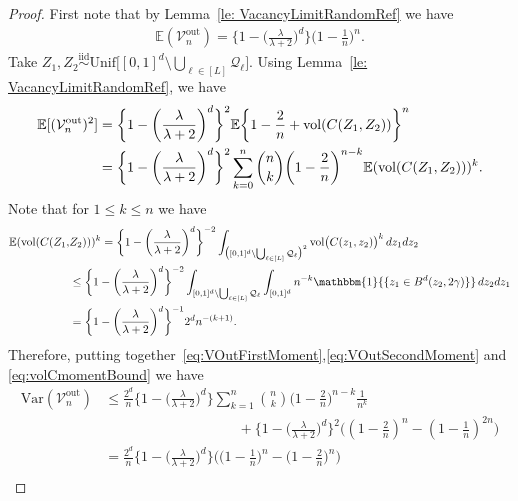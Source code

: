 \documentclass[11pt]{article}
\newcommand{\E}{\mathbb{E}}
\newcommand{\mQ}{\mathcal{Q}}
\newcommand{\vol}{\mathrm{vol}}
\newcommand{\var}{\mathrm{Var}}
\newcommand{\iid}{\stackrel{\mathrm{iid}}\sim}
\begin{document}
\begin{proof}
    First note that by Lemma~\ref{le: VacancyLimitRandomRef} we have
    \begin{align}\label{eq:VOutFirstMoment}
        \E(\mathcal{V}_n^{\mathrm{out}}) = \biggl\{1 - \biggl(\frac{\lambda}{\lambda +2 }\biggr)^d\biggr\}\biggl(1 - \frac{1}{n}\biggr)^n.
    \end{align}
    Take $Z_1, Z_2\iid\mathrm{Unif}\big[[0, 1]^d\setminus\bigcup_{\ell\in[L]}\mQ_\ell\big]$. Using Lemma~\ref{le: VacancyLimitRandomRef}, we have
    \begin{align}
        \E[(\mathcal{V}_n^{\mathrm{out}})^2] &=  \biggl\{ 1 - \biggl(\frac{\lambda}{\lambda +2 }\biggr)^d\biggr\}^2 \E\biggl\{1 - \frac{2}{n} + \vol(C(Z_1, Z_2))\biggr\}^n \notag \\ 
        & = \biggl\{ 1 - \biggl(\frac{\lambda}{\lambda + 2 }\biggr)^d\biggr\}^2  \sum_{k = 0}^n \binom{n}{k} \biggl(1 - \frac{2}{n}\biggr)^{n - k} \E(\vol(C(Z_1, Z_2)))^k \label{eq:VOutSecondMoment}.
    \end{align}
    Note that for $1\leq k \leq n$ we have
    \begin{align}
    \E(\vol(C(Z_1, &Z_2)))^k =  \biggl\{1 - \biggl(\frac{\lambda}{\lambda + 2}\biggr)^d\biggr\}^{-2} \int_{\big([0, 1]^d\setminus\bigcup_{\ell\in[L]}\mQ_\ell\big)^2}  \vol\bigl(C(z_1, z_2)\bigr)^k \, d z_1  d z_2 \notag \\ 
    & \leq \biggl\{1 - \biggl(\frac{\lambda}{\lambda + 2 }\biggr)^d\biggr\}^{-2}\int_{[0, 1]^d\setminus\bigcup_{\ell\in[L]}\mQ_\ell}\int_{[0,1]^d}  n^{-k}  \mathbbm{1}{\{z_1\in B^d(z_2,2\gamma)\}}\, d z_2 dz_1 \notag\\ 
    & = \biggl\{ 1 - \biggl(\frac{\lambda}{\lambda +2 }\biggr)^d\biggr\}^{-1}2^d n^{-(k + 1)}. \label{eq:volCmomentBound}
\end{align}
Therefore, putting together~\eqref{eq:VOutFirstMoment},\eqref{eq:VOutSecondMoment} and \eqref{eq:volCmomentBound} we have
\begin{align*}
    \var(\mathcal{V}_n^{\mathrm{out}}) &\leq \frac{2^d}{n} \biggl\{1 - \biggl(\frac{\lambda}{\lambda +2 }\biggr)^d\biggr\}\sum_{k = 1}^n\binom{n}{k}\biggl(1 - \frac{2}{n}\biggr)^{n - k}\frac{1}{n^{k}} \\
    &\hspace{4cm}+ \biggl\{1 - \biggl(\frac{\lambda}{\lambda +2 }\biggr)^d\biggr\}^2\bigg((1 - \frac{2}{n})^n - (1 - \frac{1}{n})^{2n}\bigg)\\
    &= \frac{2^d}{n} \biggl\{1 - \biggl(\frac{\lambda}{\lambda +2 }\biggr)^d\biggr\}\bigg(\big(1 - \frac{1}{n}\big)^n - \big(1 - \frac{2}{n}\big)^n\bigg) \\

\end{align*}
\end{proof}
\end{document}
